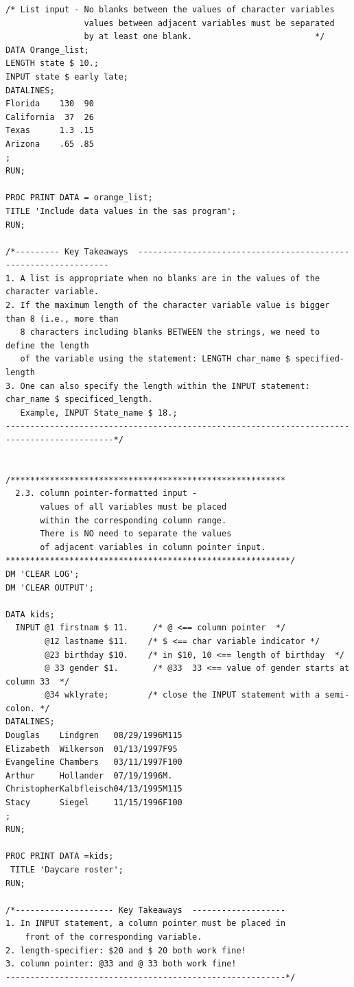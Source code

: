 \documentclass[
]{book}
\begin{document}
\begin{verbatim}
/* List input - No blanks between the values of character variables 
                values between adjacent variables must be separated 
                by at least one blank.                         */
DATA Orange_list;
LENGTH state $ 10.;
INPUT state $ early late;
DATALINES;
Florida    130  90
California  37  26
Texas      1.3 .15
Arizona    .65 .85
;
RUN;

PROC PRINT DATA = orange_list;
TITLE 'Include data values in the sas program';
RUN;

/*--------- Key Takeaways  ----------------------------------------------------------------
1. A list is appropriate when no blanks are in the values of the character variable.
2. If the maximum length of the character variable value is bigger than 8 (i.e., more than
   8 characters including blanks BETWEEN the strings, we need to define the length 
   of the variable using the statement: LENGTH char_name $ specified-length
3. One can also specify the length within the INPUT statement: char_name $ specificed_length.
   Example, INPUT State_name $ 18.;
--------------------------------------------------------------------------------------------*/


/********************************************************
  2.3. column pointer-formatted input - 
       values of all variables must be placed
       within the corresponding column range. 
       There is NO need to separate the values
       of adjacent variables in column pointer input. 
**********************************************************/
DM 'CLEAR LOG';
DM 'CLEAR OUTPUT';

DATA kids;
  INPUT @1 firstnam $ 11.     /* @ <== column pointer  */
        @12 lastname $11.    /* $ <== char variable indicator */
        @23 birthday $10.    /* in $10, 10 <== length of birthday  */
        @ 33 gender $1.       /* @33  33 <== value of gender starts at column 33  */
        @34 wklyrate;        /* close the INPUT statement with a semi-colon. */
DATALINES;                     
Douglas    Lindgren   08/29/1996M115
Elizabeth  Wilkerson  01/13/1997F95
Evangeline Chambers   03/11/1997F100
Arthur     Hollander  07/19/1996M.
ChristopherKalbfleisch04/13/1995M115
Stacy      Siegel     11/15/1996F100
;
RUN;

PROC PRINT DATA =kids;
 TITLE 'Daycare roster';
RUN;

/*-------------------- Key Takeaways  -------------------
1. In INPUT statement, a column pointer must be placed in 
    front of the corresponding variable.
2. length-specifier: $20 and $ 20 both work fine!
3. column pointer: @33 and @ 33 both work fine!
---------------------------------------------------------*/



\end{verbatim}
\end{document}

